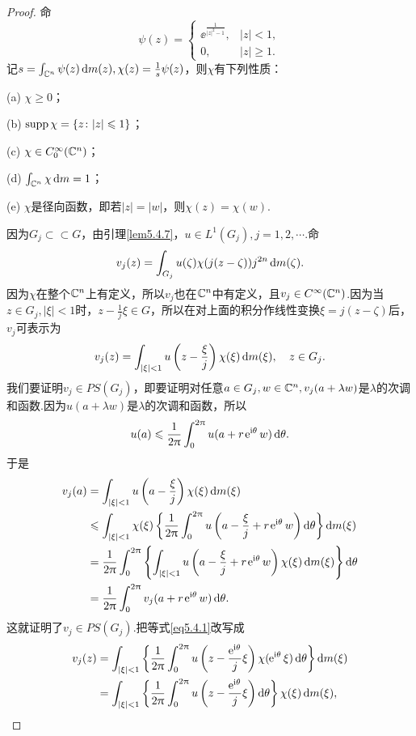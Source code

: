 \begin{proof}
	命
	\[\psi(z)=\begin{cases}
		\ee^{\frac1{|z|^2-1}},&|z|<1,\\
		0,&|z|\ge1.
	\end{cases}\]
记$s=\int_{\mathbb C^n} \psi(z)\mathop{}\!\mathrm{d} m(z),\chi(z)=\frac1s \psi(z)$，则$\chi$有下列性质：

(a) $\chi\ge0$；

(b) $\operatorname{supp}\chi=\{z\colon|z|\leqslant1\}$；

(c) $\chi\in C_0^\infty(\mathbb C^n)$；

(d) $\int_{\mathbb C^n}\chi\mathop{}\!\mathrm{d} m=1$；

(e) $\chi$是径向函数，即若$|z|=|w|$，则$\chi(z)=\chi(w)$.

因为$G_j\subset\subset G$，由引理\ref{lem5.4.7}，$u\in L^1(G_j),j=1,2,\cdots$.命
\[v_j(z)=\int_{G_j}u(\zeta)\chi(j(z-\zeta))j^{2n}\mathop{}\!\mathrm{d} m(\zeta).\]
因为$\chi$在整个$\mathbb C^n$上有定义，所以$v_j$也在$\mathbb C^n$中有定义，且$v_j\in C^\infty(\mathbb C^n)$.因为当$z\in G_j,|\xi|<1$时，$z-\frac1j \xi\in G$，所以在对上面的积分作线性变换$\xi=j(z-\zeta)$后，$v_j$可表示为
\begin{equation}\label{eq5.4.1}
	v_j(z)=\int_{|\xi|<1}u\left(z-\frac{\xi}{j}\right)\chi(\xi)\mathop{}\!\mathrm{d} m(\xi),\quad z\in G_j.
\end{equation}
我们要证明$v_j\in PS(G_j)$，即要证明对任意$a\in G_j,w\in\mathbb C^n,v_j(a+\lambda w)$是$\lambda$的次调和函数.因为$u(a+\lambda w)$是$\lambda$的次调和函数，所以
\[u(a)\leqslant\frac1{2\uppi}\int_{0}^{2\uppi}u(a+r\operatorname{\!\!\;\mathrm e}^{\mathrm i\theta}w)\mathop{}\!\mathrm{d}\theta.\]
于是
\begin{align*}
	v_j(a)
	&=\int_{|\xi|<1}u\left(a-\frac{\xi}{j}\right)\chi(\xi)\dif m(\xi)\\
	&\le\int_{|\xi|<1}\chi(\xi)\left\{\frac1{2\pi}\int_{0}^{2\pi}u\left(a-\frac{\xi}{j}+r\ee^{\ii\theta}w\right)\dif\theta\right\}\dif m(\xi)\\
	&=\frac1{2\pi}\int_{0}^{2\pi}\left\{\int_{|\xi|<1}u\left(a-\frac{\xi}{j}+r\ee^{\ii\theta}w\right)\chi(\xi)\dif m(\xi)\right\}\dif\theta\\
	&=\frac1{2\pi}\int_{0}^{2\pi}v_j(a+r\ee^{\ii\theta}w)\dif\theta.
\end{align*}
这就证明了$v_j\in PS(G_j)$.把等式\eqref{eq5.4.1}改写成
\begin{align}\label{eq5.4.2}
	v_j(z)
	&=\int_{|\xi|<1}\left\{\frac1{2\pi}\int_{0}^{2\pi} u\left(z-\frac{\ee^{\ii\theta}}{j}\xi\right)\chi(\ee^{\ii\theta}\xi)\dif\theta\right\}\dif m(\xi)\notag\\
	&=\int_{|\xi|<1}\left\{\frac1{2\pi}\int_{0}^{2\pi} u\left(z-\frac{\ee^{\ii\theta}}{j}\xi\right)\dif\theta\right\}\chi(\xi)\dif m(\xi),

\end{align}
\end{proof}
